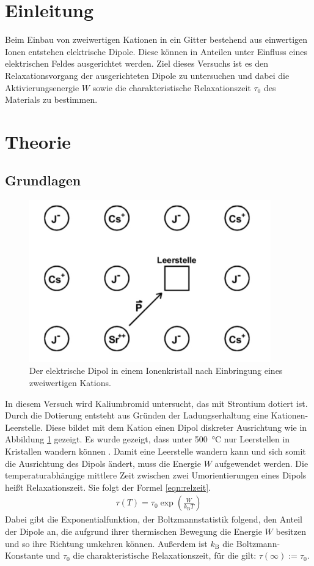 \section{Einleitung}

Beim Einbau von zweiwertigen Kationen in ein Gitter bestehend aus einwertigen Ionen entstehen elektrische Dipole. Diese können in Anteilen unter Einfluss eines elektrischen Feldes ausgerichtet werden. Ziel dieses Versuchs ist es den Relaxationsvorgang der ausgerichteten Dipole zu untersuchen und dabei die Aktivierungsenergie $W$ sowie die charakteristische Relaxationszeit $\tau_0$ des Materials zu bestimmen.

\section{Theorie}
\label{sec:Theorie}

\subsection{Grundlagen}


\begin{figure}
  \centering
  \includegraphics[height= 7cm]{BestNippelpiercings/gitter.pdf}
  \caption{Der elektrische Dipol in einem Ionenkristall nach Einbringung eines zweiwertigen Kations. \cite{anleitung}}
  \label{fig:gitter}
\end{figure}

In diesem Versuch wird Kaliumbromid untersucht, das mit Strontium dotiert ist. Durch die Dotierung entsteht aus Gründen der Ladungserhaltung eine Kationen-Leerstelle. Diese bildet mit dem Kation einen Dipol diskreter Ausrichtung wie in Abbildung \ref{fig:gitter} gezeigt. Es wurde gezeigt, dass unter \SI{500}{\celsius} nur Leerstellen in Kristallen wandern können \cite{wjost}. Damit eine Leerstelle wandern kann und sich somit die Ausrichtung des Dipols ändert, muss die Energie $W$ aufgewendet werden. Die temperaturabhängige mittlere Zeit zwischen zwei Umorientierungen eines Dipols heißt Relaxationszeit. Sie folgt der Formel \eqref{eqn:relzeit}.
\begin{align}
  \tau(T) = \tau_0 \exp\left(\frac{W}{k_\text{B} T}\right) \label{eqn:relzeit}
\end{align}
Dabei gibt die Exponentialfunktion, der Boltzmannstatistik folgend, den Anteil der Dipole an, die aufgrund ihrer thermischen Bewegung die Energie $W$ besitzen und so ihre Richtung umkehren können.
Außerdem ist $k_\text{B}$ die Boltzmann-Konstante und $\tau_0$ die charakteristische Relaxationszeit, für die gilt: $\tau(\infty) := \tau_0$.

